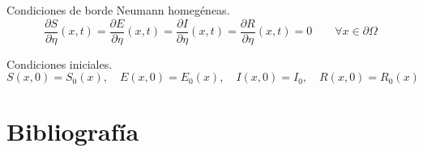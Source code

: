 \documentclass[a4paper, 10pt, twoside]{article}
\begin{document}
Condiciones de borde Neumann homegéneas.
\begin{equation}
\frac{\partial S}{\partial \eta}( x, t ) = 
\frac{\partial E}{\partial \eta}( x, t ) = 
\frac{\partial I}{\partial \eta}( x, t ) = 
\frac{\partial R}{\partial \eta}( x, t ) = 0 \qquad \forall x \in \partial \Omega
\end{equation}

Condiciones iniciales.
\begin{equation}
S( x, 0 ) = S_0( x ),\quad E( x, 0 ) = E_0( x ),\quad I( x, 0 ) = I_0,\quad R( x, 0 ) = R_0( x )
\end{equation}

\clearpage
\textcite{accu_stab_num_alg, fun_ergo_theo, pde_evans, trans_equ_bio_2007, 
	real_comp_ana_1987, func_ana_1987}

\section{Bibliografía}
\printbibliography[heading = none]
 
\end{document}
